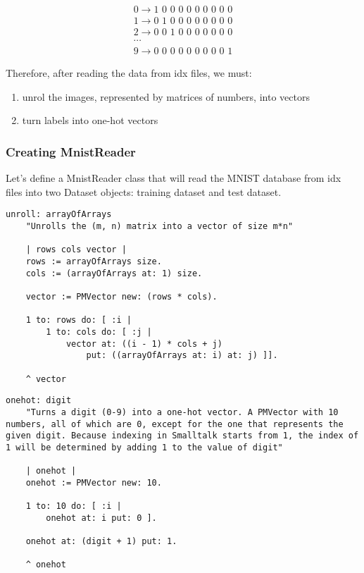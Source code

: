 \begin{gather*}
0 \longrightarrow \text{1 0 0 0 0 0 0 0 0 0}\\
1 \longrightarrow \text{0 1 0 0 0 0 0 0 0 0}\\
2 \longrightarrow \text{0 0 1 0 0 0 0 0 0 0}\\
\cdots\\
9 \longrightarrow \text{0 0 0 0 0 0 0 0 0 1}
\end{gather*}

Therefore, after reading the data from idx files, we must:
\begin{enumerate}
  \item unrol the images, represented by matrices of numbers, into vectors
  \item turn labels into one-hot vectors
\end{enumerate}

\subsubsection{Creating MnistReader}
Let's define a MnistReader class that will read the MNIST database from idx files into two Dataset objects: training dataset and test dataset.

\begin{lstlisting}
unroll: arrayOfArrays
	"Unrolls the (m, n) matrix into a vector of size m*n"

	| rows cols vector |
	rows := arrayOfArrays size.
	cols := (arrayOfArrays at: 1) size.
	
	vector := PMVector new: (rows * cols).
	
	1 to: rows do: [ :i |
		1 to: cols do: [ :j |
			vector at: ((i - 1) * cols + j)
				put: ((arrayOfArrays at: i) at: j) ]].
		
	^ vector
\end{lstlisting}

\begin{lstlisting}
onehot: digit
	"Turns a digit (0-9) into a one-hot vector. A PMVector with 10 numbers, all of which are 0, except for the one that represents the given digit. Because indexing in Smalltalk starts from 1, the index of 1 will be determined by adding 1 to the value of digit"

	| onehot |
	onehot := PMVector new: 10.
	
	1 to: 10 do: [ :i |
		onehot at: i put: 0 ].

	onehot at: (digit + 1) put: 1.
	
	^ onehot
\end{lstlisting}

